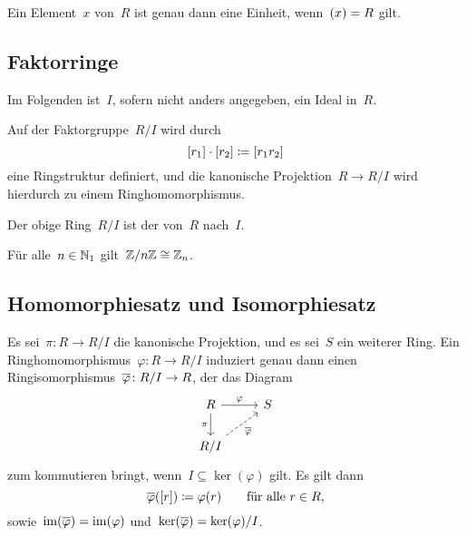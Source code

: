 \begin{proposition}
  Ein Element~$x$ von~$R$ ist genau dann eine Einheit, wenn~$(x) = R$ gilt.
\end{proposition}





\subsection{Faktorringe}

\begin{convention}
  Im Folgenden ist~$I$, sofern nicht anders angegeben, ein Ideal in~$R$.
\end{convention}

Auf der Faktorgruppe~$R/I$ wird durch
\[
  [r_1] \cdot [r_2]
  \coloneqq
  [r_1 r_2]
\]
eine Ringstruktur definiert, und die kanonische Projektion~$R \to R/I$ wird hierdurch zu einem Ringhomomorphismus.

\begin{definition}
  Der obige Ring~$R/I$ ist der  von~$R$ nach~$I$.
\end{definition}

\begin{example}
  Für alle~$n \in \mathbb{N}_1$ gilt~$\mathbb{Z} / n \mathbb{Z} \cong \mathbb{Z}_n$.
\end{example}



\subsection{Homomorphiesatz und Isomorphiesatz}


\begin{theorem}[Homomorphiesatz]
  Es sei~$\pi \colon R \to R/I$ die kanonische Projektion, und es sei~$S$ ein weiterer Ring.
  Ein Ringhomomorphismus~$\varphi \colon R \to R/I$ induziert genau dann einen Ringisomorphismus~$\induced{\varphi} \colon R/I \to R$, der das Diagram
  \[
    \begin{tikzcd}
      R
      \arrow{r}[above]{\varphi}
      \arrow{d}[left]{\pi}
      &
      S
      \\
      R/I
      \arrow[dashed]{ur}[below right]{\induced{\varphi}}
      &
      {}
    \end{tikzcd}
  \]
  zum kommutieren bringt, wenn~$I \subseteq \ker(\varphi)$ gilt.
  Es gilt dann
  \[
    \overline{\varphi}( [r] )
    \coloneqq
    \varphi(r)
    \qquad
    \text{für alle~$r \in R$,}
  \]
  sowie~$\operatorname{im}(\overline{\varphi}) = \operatorname{im}(\varphi)$ und~$\ker(\overline{\varphi}) = \ker(\varphi)/I$.
\end{theorem}

